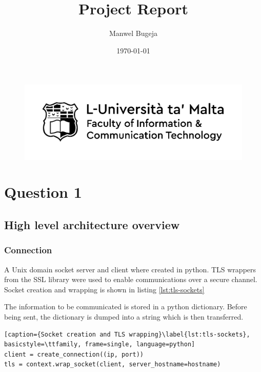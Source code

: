 \documentclass[a4paper, 12pt]{article}
\begin{document}
\begin{figure}
    \centering
    \includegraphics[width=1\textwidth]{Logo}
\end{figure}

\title{Project Report}
\author{Manwel Bugeja}
\date{\today}
\maketitle
  
\tableofcontents
\newpage


\section{Question 1}
\subsection{High level architecture overview}
\subsubsection{Connection}
A Unix domain socket server and client where created in python. TLS wrappers from the SSL library were used to enable communications over a secure channel. Socket creation and wrapping is shown in listing \ref{lst:tls-sockets}
\par
The information to be communicated is stored in a python dictionary. Before being sent, the dictionary is dumped into a string which is then transferred.

\begin{lstlisting}[caption={Socket creation and TLS wrapping}\label{lst:tls-sockets}, basicstyle=\ttfamily, frame=single, language=python]
client = create_connection((ip, port))
tls = context.wrap_socket(client, server_hostname=hostname)
\end{lstlisting}
\end{document}
